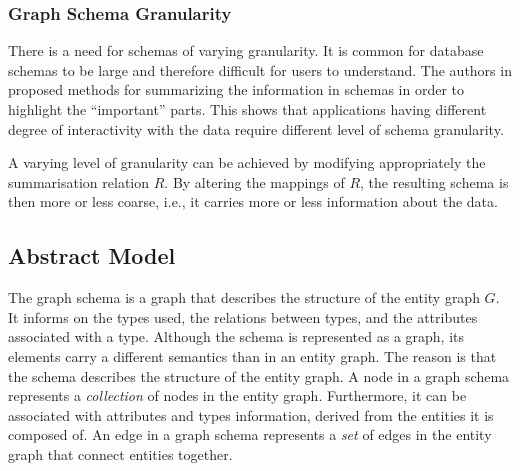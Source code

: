 \subsubsection{Graph Schema Granularity}

There is a need for schemas of varying granularity. It is common for database schemas to be large and therefore difficult for users to understand. The authors in \cite{yu:2006:schema-summarization,yang:2011:summary-graphs} proposed methods for summarizing the information in schemas in order to highlight the ``important'' parts. This shows that applications having different degree of interactivity with the data require different level of schema granularity.

A varying level of granularity can be achieved by modifying appropriately the summarisation relation $R$. By altering the mappings of $R$, the resulting schema is then more or less coarse, i.e., it carries more or less information about the data.

\subsection{Abstract Model}
\label{sec:gschema:abstract-model}

The graph schema is a graph that describes the structure of the entity graph $G$. It informs on the types used, the relations between types, and the attributes associated with a type.
Although the schema is represented as a graph, its elements carry a different semantics than in an entity graph. The reason is that the schema describes the structure of the entity graph. A node in a graph schema represents a \emph{collection} of nodes in the entity graph. Furthermore, it can be associated with attributes and types information, derived from the entities it is composed of. An edge in a graph schema represents a \emph{set} of edges in the entity graph that connect entities together.

